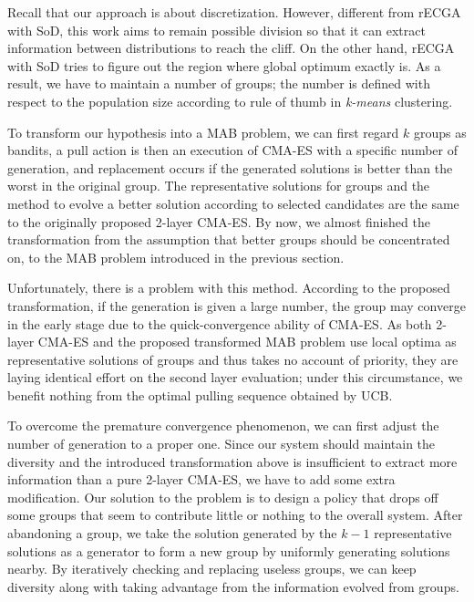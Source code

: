 Recall that our approach is about discretization.
However, different from rECGA with SoD, this work aims to remain
possible division so that it can extract information between distributions
to reach the cliff.
On the other hand, rECGA with SoD tries to figure out the region where
global optimum exactly is.
As a result, we have to maintain a number of groups; the number is
defined with respect to the population size according to rule of thumb
in \emph{k-means} clustering.

To transform our hypothesis into a MAB problem, we can first regard $k$
groups as bandits, a pull action is then an execution of CMA-ES with a
specific number of generation, and replacement occurs if the generated
solutions is better than the worst in the original group.
The representative solutions for groups and the method to evolve a
better solution according to selected candidates are the same to the
originally proposed 2-layer CMA-ES.
By now, we almost finished the transformation from the assumption that
better groups should be concentrated on, to the MAB problem introduced
in the previous section.

Unfortunately, there is a problem with this method.
According to the proposed transformation, if the generation is given a
large number, the group may converge in the early stage due to the
quick-convergence ability of CMA-ES.
As both 2-layer CMA-ES and the proposed transformed MAB problem use
local optima as representative solutions of groups and thus takes no
account of priority, they are laying identical effort on the second
layer evaluation; under this circumstance, we benefit nothing from the
optimal pulling sequence obtained by UCB.

To overcome the premature convergence phenomenon, we can first adjust
the number of generation to a proper one. 
Since our system should maintain the diversity and the
introduced transformation above is insufficient to extract more
information than a pure 2-layer CMA-ES, we have to add some extra
modification.
Our solution to the problem is to design a policy that drops off some
groups that seem to contribute little or nothing to the overall system.
After abandoning a group, we take the solution generated by the $k-1$
representative solutions as a generator to form a new group by uniformly
generating solutions nearby.
By iteratively checking and replacing useless groups, we can keep
diversity along with taking advantage from the information evolved from
groups. 

